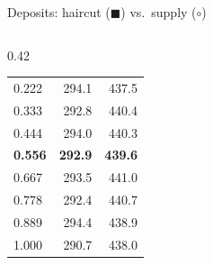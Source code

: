 \documentclass[aspectratio=169,10pt]{beamer}
\begin{document}
\begin{frame}{Deposits: haircut ($\blacksquare$) vs.\ supply ($\circ$)}
\begin{columns}[T]
\begin{column}{0.42\textwidth}
\begin{tabular}{lrr}
        0.222 & 294.1 & 437.5 \\
        0.333 & 292.8 & 440.4 \\
        0.444 & 294.0 & 440.3 \\
        \textbf{0.556} & \textbf{292.9} & \textbf{439.6} \\
        0.667 & 293.5 & 441.0 \\
        0.778 & 292.4 & 440.7 \\
        0.889 & 294.4 & 438.9 \\
        1.000 & 290.7 & 438.0 \\
        \bottomrule
      \end{tabular}
    \end{column}
  \end{columns}
\end{frame}
\end{document}
